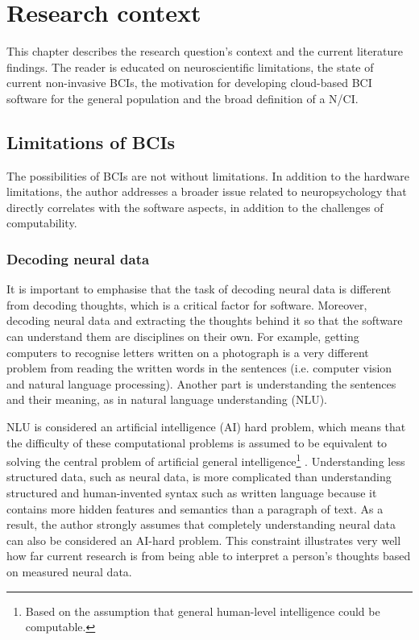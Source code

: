 \chapter{Research context}
\graphicspath{{Chapter2/Figs/}{Chapter2/Figs/}}

This chapter describes the research question's context and the current literature findings. The reader is educated on neuroscientific limitations, the state of current non-invasive BCIs, the motivation for developing cloud-based BCI software for the general population and the broad definition of a N/CI.

\section{Limitations of BCIs}
\label{chapter2-limitations-of-bcis}

The possibilities of BCIs are not without limitations. In addition to the hardware limitations, the author addresses a broader issue related to neuropsychology that directly correlates with the software aspects, in addition to the challenges of computability.

\subsection{Decoding neural data}
\label{chapter2-decoding-neural-data}

It is important to emphasise that the task of decoding neural data is different from decoding thoughts, which is a critical factor for software. Moreover, decoding neural data and extracting the thoughts behind it so that the software can understand them are disciplines on their own. For example, getting computers to recognise letters written on a photograph is a very different problem from reading the written words in the sentences (i.e. computer vision and natural language processing). Another part is understanding the sentences and their meaning, as in natural language understanding (NLU).

NLU is considered an artificial intelligence (AI) hard problem, which means that the difficulty of these computational problems is assumed to be equivalent to solving the central problem of artificial general intelligence\footnote{Based on the assumption that general human-level intelligence could be computable.} \citep{demasi_theoretical_2010}. Understanding less structured data, such as neural data, is more complicated than understanding structured and human-invented syntax such as written language because it contains more hidden features and semantics than a paragraph of text. As a result, the author strongly assumes that completely understanding neural data can also be considered an AI-hard problem. This constraint illustrates very well how far current research is from being able to interpret a person's thoughts based on measured neural data.

